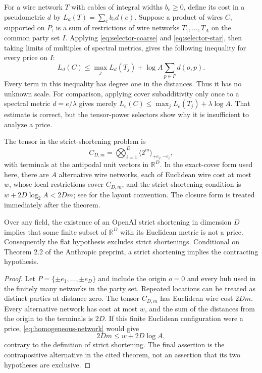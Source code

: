 For a wire network $T$ with cables of integral widths $b_e\geq0$, define its cost in a pseudometric $d$ by $L_d(T)=\sum_e b_e d(e)$. Suppose a product of wires $C$, supported on $P$, is a sum of restrictions of wire networks $T_1,\ldots,T_A$ on the common party set $I$. Applying \eqref{eq:selector-coarse} and \eqref{eq:selector-star}, then taking limits of multiples of spectral metrics, gives the following inequality for every price on $I$:
\begin{equation}\label{eq:homogeneous-network}
 L_d(C)\leq\max_jL_d(T_j)+\log A\sum_{p\in P}d(o,p).
\end{equation}
Every term in this inequality has degree one in the distances. Thus it has no unknown scale. For comparison, applying cover subadditivity only once to a spectral metric $d=e/\lambda$ gives merely $L_e(C)\leq\max_jL_e(T_j)+\lambda\log A$. That estimate is correct, but the tensor-power selectors show why it is insufficient to analyze a price.

The tensor in the strict-shortening problem is
\[
 C_{D,m}=\bigotimes_{i=1}^D\langle2^m\rangle_{+e_i,-e_i},
\]
with terminals at the antipodal unit vectors in $\mathbb R^D$.
In the exact-cover form used here, there are $A$ alternative wire
networks, each of Euclidean wire cost at most $w$, whose local
restrictions cover $C_{D,m}$, and the strict-shortening condition is
$w+2D\log_2 A<2Dm$; see \cite[Section 2]{OpenAI2026} for the
layout convention. The closure form is treated immediately after
the theorem.

\begin{theorem}\label{thm:shortening-nonflat}
Over any field, the existence of an OpenAI strict shortening in dimension $D$ implies that some finite subset of $\mathbb R^D$ with its Euclidean metric is not a price. Consequently the flat hypothesis excludes strict shortenings. Conditional on Theorem 2.2 of the Anthropic preprint, a strict shortening implies the contracting hypothesis.
\end{theorem}
\begin{proof}
Let $P=\{\pm e_1,\ldots,\pm e_D\}$ and include the origin $o=0$ and every hub used in the finitely many networks in the party set. Repeated locations can be treated as distinct parties at distance zero. The tensor $C_{D,m}$ has Euclidean wire cost $2Dm$. Every alternative network has cost at most $w$, and the sum of the distances from the origin to the terminals is $2D$. If this finite Euclidean configuration were a price, \eqref{eq:homogeneous-network} would give
\[
 2Dm\leq w+2D\log A,
\]
contrary to the definition of strict shortening. The final assertion is the contrapositive alternative in the cited theorem, not an assertion that its two hypotheses are exclusive.
\end{proof}

